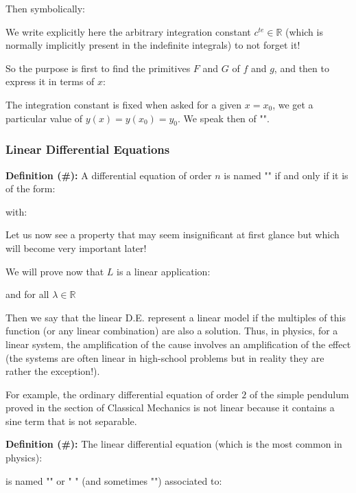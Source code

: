 	Then symbolically:
	
	\begin{tcolorbox}[title=Remark,colframe=black,arc=10pt]
	We write explicitly here the arbitrary integration constant $c^{te} \in \mathbb{R}$ (which is normally implicitly present in the indefinite integrals) to not forget it!
	\end{tcolorbox}
	So the purpose is first to find the primitives $F$ and $G$ of $f$ and $g$, and then to express it in terms of $x$:
	
	The integration constant is fixed when asked for a given $x=x_0$, we get a particular value of $y(x)=y(x_0)=y_0$. We speak then of "".
	
	\subsubsection{Linear Differential Equations}
	\textbf{Definition (\#\mydef):} A differential equation of order $n$ is named "" if and only if it is of the form:
	
	with:
	
	Let us now see a property that may seem insignificant at first glance but which will become very important later!
	
	We will prove now that $L$ is a linear application:
	
	and for all $\lambda \in \mathbb{R}$
	
	Then we say that the linear D.E. represent a linear model if the multiples of this function (or any linear combination) are also a solution. Thus, in physics, for a linear system, the amplification of the cause involves an amplification of the effect (the systems are often linear in high-school problems but in reality they are rather the exception!).
	
	For example, the ordinary differential equation of order $2$ of the simple pendulum proved in the section of Classical Mechanics is not linear because it contains a sine term that is not separable.

	\textbf{Definition (\#\mydef):} The linear differential equation (which is the most common in physics):
	
	is named "" or " " (and sometimes "") associated to:
	
